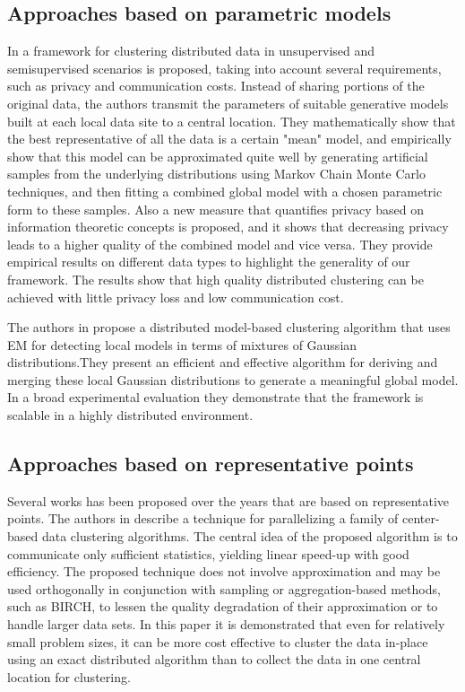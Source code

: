 \documentclass[a4paper]{article}
\begin{document}
\subsection{Approaches based on parametric models}
In \cite{MG03} a framework for clustering distributed data in unsupervised and semisupervised scenarios is proposed, taking into account several requirements, such as privacy and communication costs. Instead of sharing portions of the original data, the authors transmit the parameters of suitable generative models built at each local data site to a central location. They mathematically show that the best representative of all the data is a certain "mean" model, and empirically show that this model can be approximated quite well by generating artificial samples from the underlying distributions using Markov Chain Monte Carlo techniques, and then fitting a combined global model with a chosen parametric form to these samples. Also a new measure that quantifies privacy based on information theoretic concepts is proposed, and it shows that decreasing privacy leads to a higher quality of the combined model and vice versa. They provide empirical results on different data types to highlight the generality of our framework. The results show that high quality distributed clustering can be achieved with little privacy loss and low communication cost.

The authors in \cite{KKPS05} propose a distributed model-based clustering algorithm that uses EM for detecting local models in terms of mixtures of Gaussian distributions.They present an efficient and effective algorithm for deriving and merging these local Gaussian distributions to generate a meaningful global model. In a broad experimental evaluation they demonstrate that the framework is scalable in a highly distributed environment.


\subsection{Approaches based on representative points}


Several works has been proposed over the years that are based on representative points. 
The authors in \cite{FZ00} describe a technique for parallelizing a family of center-based data clustering algorithms. The central idea of the proposed algorithm is to communicate only sufficient statistics, yielding linear speed-up with good efficiency. The proposed technique does not involve approximation and may be used orthogonally in conjunction with sampling or aggregation-based methods, such as BIRCH, to lessen the quality degradation of their approximation or to handle larger data sets. In this paper it is demonstrated that even for relatively small problem sizes, it can be more cost effective to cluster the data in-place using an exact distributed algorithm than to collect the data in one central location for clustering.
\end{document}
